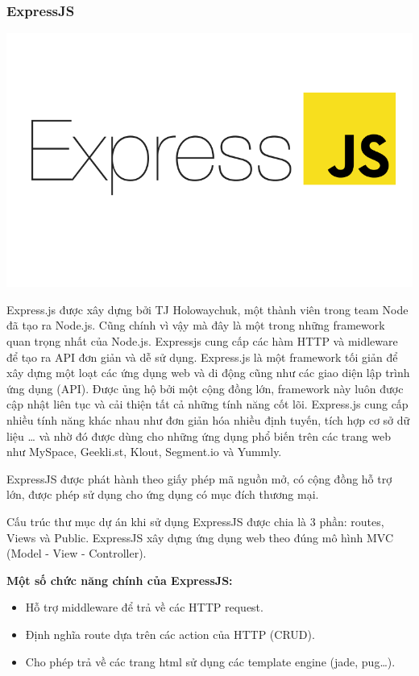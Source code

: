 \subsubsection{ExpressJS}
\begin{center}
  \captionsetup{type=figure}
  \includegraphics[width=15cm]{img/expressjs.png}
\end{center}

Express.js được xây dựng bởi TJ Holowaychuk, một thành viên trong team Node đã tạo ra Node.js. Cũng chính vì vậy mà đây là một trong những framework quan trọng nhất của Node.js. Expressjs cung cấp các hàm HTTP và midleware để tạo ra API đơn giản và dễ sử dụng. Express.js là một framework tối giản để xây dựng một loạt các ứng dụng web và di động cũng như các giao diện lập trình ứng dụng (API). Được ủng hộ bởi một cộng đồng lớn, framework này luôn được cập nhật liên tục và cải thiện tất cả những tính năng cốt lõi. Express.js cung cấp nhiều tính năng khác nhau như đơn giản hóa nhiều định tuyến, tích hợp cơ sở dữ liệu … và nhờ đó được dùng cho những ứng dụng phổ biến trên các trang web như MySpace, Geekli.st, Klout, Segment.io và Yummly.

ExpressJS được phát hành theo giấy phép mã nguồn mở, có cộng đồng hỗ trợ lớn, được phép sử dụng cho ứng dụng có mục đích thương mại.

Cấu trúc thư mục dự án khi sử dụng ExpressJS được chia là 3 phần: routes, Views và Public. ExpressJS xây dựng ứng dụng web theo đúng mô hình MVC (Model - View - Controller).

\textbf{Một số chức năng chính của ExpressJS:}
\begin{itemize}
  \item Hỗ trợ middleware để trả về các HTTP request.
  \item Định nghĩa route dựa trên các action của HTTP (CRUD).
  \item Cho phép trả về các trang html sử dụng các template engine (jade, pug…).
\end{itemize}

